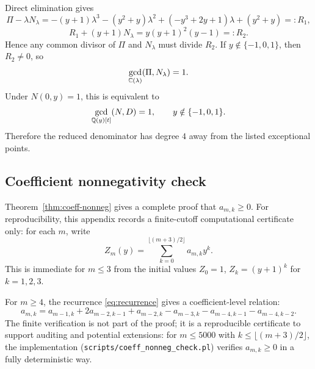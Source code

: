 Direct elimination gives
\[
\Pi-\lambda N_{\lambda}=-(y+1)\lambda^3-(y^2+y)\lambda^2+(-y^3+2y+1)\lambda+(y^2+y)=:R_1,
\]
\[
R_1+(y+1)N_{\lambda}=y(y+1)^2(y-1)=:R_2.
\]
Hence any common divisor of \(\Pi\) and \(N_{\lambda}\) must divide \(R_2\).
If \(y\notin\{-1,0,1\}\), then \(R_2\neq0\), so
\[
\gcd_{\mathbb{C}(\lambda)}(\Pi,N_{\lambda})=1.
\]
Under \(N(0,y)=1\), this is equivalent to
\[
\gcd_{\mathbb{Q}(y)[t]}(N,D)=1,\qquad y\notin\{-1,0,1\}.
\]
Therefore the reduced denominator has degree \(4\) away from the listed exceptional points.

\subsection{Coefficient nonnegativity check}

Theorem~\ref{thm:coeff-nonneg} gives a complete proof that $a_{m,k}\ge0$.  For reproducibility, this appendix records a finite-cutoff computational certificate only: for each $m$, write
\[
Z_m(y)=\sum_{k=0}^{\lfloor (m+3)/2\rfloor} a_{m,k}y^k.
\]
This is immediate for $m\le 3$ from the initial values $Z_0=1$, $Z_k=(y+1)^k$ for $k=1,2,3$.

For $m\ge 4$, the recurrence \eqref{eq:recurrence} gives a coefficient-level relation:
\[
a_{m,k}=a_{m-1,k}+2a_{m-2,k-1}+a_{m-2,k}-a_{m-3,k}-a_{m-4,k-1}-a_{m-4,k-2}.
\]
The finite verification is not part of the proof; it is a reproducible certificate to support auditing and potential extensions:
for $m\le 5000$ with $k\le\lfloor (m+3)/2\rfloor$, the implementation (\texttt{scripts/coeff\_nonneg\_check.pl}) verifies $a_{m,k}\ge0$ in a fully deterministic way.

